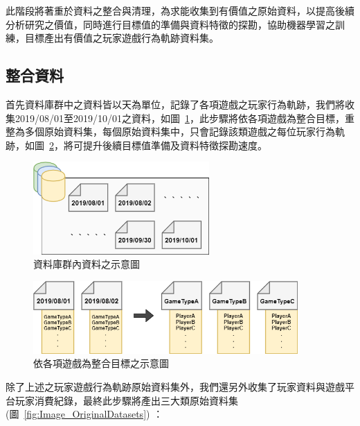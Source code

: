 此階段將著重於資料之整合與清理，為求能收集到有價值之原始資料，以提高後續分析研究之價值，同時進行目標值的準備與資料特徵的探勘，協助機器學習之訓練，目標產出有價值之玩家遊戲行為軌跡資料集。

\subsection{整合資料}

首先資料庫群中之資料皆以天為單位，記錄了各項遊戲之玩家行為軌跡，我們將收集2019/08/01至2019/10/01之資料，如圖~\ref{fig:Image_Databases}，此步驟將依各項遊戲為整合目標，重整為多個原始資料集，每個原始資料集中，只會記錄該類遊戲之每位玩家行為軌跡，如圖~\ref{fig:Image_Integration}，將可提升後續目標值準備及資料特徵探勘速度。

\begin{figure}[!htb]
  \begin{center}
    \includegraphics[width=0.6\textwidth]{figures/Image_Databases.png}
    \caption[資料庫群內資料之示意圖]{資料庫群內資料之示意圖}
    \label{fig:Image_Databases}
  \end{center}
\end{figure}

\begin{figure}[!htb]
  \begin{center}
    \includegraphics[width=0.9\textwidth]{figures/Image_Integration.png}
    \caption[依各項遊戲為整合目標之示意圖]{依各項遊戲為整合目標之示意圖}
    \label{fig:Image_Integration}
  \end{center}
\end{figure}
\newpage

除了上述之玩家遊戲行為軌跡原始資料集外，我們還另外收集了玩家資料與遊戲平台玩家消費紀錄，最終此步驟將產出三大類原始資料集 (圖~\ref{fig:Image_OriginalDatasets}) ：

